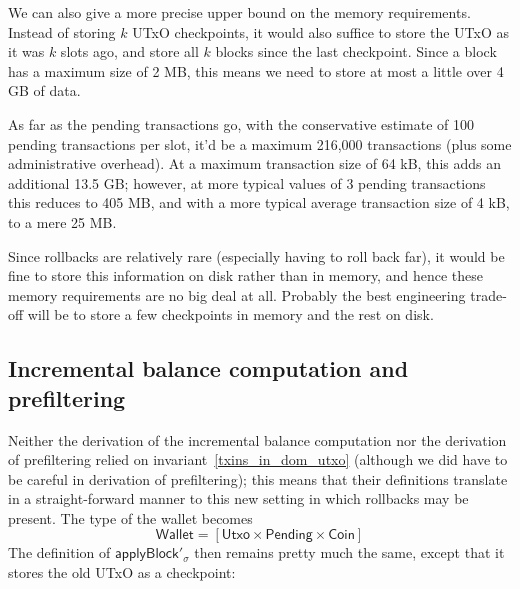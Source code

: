 \documentclass{article}
\begin{document}

We can also give a more precise upper bound on the memory requirements. Instead
of storing $k$ UTxO checkpoints, it would also suffice to store the UTxO as it
was $k$ slots ago, and store all $k$ blocks since the last checkpoint. Since a
block has a maximum size of 2 MB, this means we need to store at most a little
over 4 GB of data.

As far as the pending transactions go, with the conservative estimate of 100
pending transactions per slot, it'd be a maximum 216,000 transactions (plus some
administrative overhead). At a maximum transaction size of 64 kB, this adds an
additional 13.5 GB; however, at more typical values of 3 pending transactions
this reduces to 405 MB, and with a more typical average transaction size of 4
kB, to a mere 25 MB.

Since rollbacks are relatively rare (especially having to roll back far), it
would be fine to store this information on disk rather than in memory, and hence
these memory requirements are no big deal at all. Probably the best engineering
trade-off will be to store a few checkpoints in memory and the rest on disk.


\subsection{Incremental balance computation and prefiltering}

Neither the derivation of the incremental balance computation nor the derivation
of prefiltering relied on invariant~\eqref{txins_in_dom_utxo} (although we did
have to be careful in derivation of prefiltering); this means that their
definitions translate in a straight-forward manner to this new setting in which
rollbacks may be present. The type of the wallet becomes
%
\begin{equation*}
\mathsf{Wallet} = [\mathsf{Utxo} \times \mathsf{Pending} \times \mathsf{Coin}]
\end{equation*}
%
The definition of $\mathsf{applyBlock}'_\sigma$ then remains pretty much the
same, except that it stores the old UTxO as a checkpoint:
\end{document}
